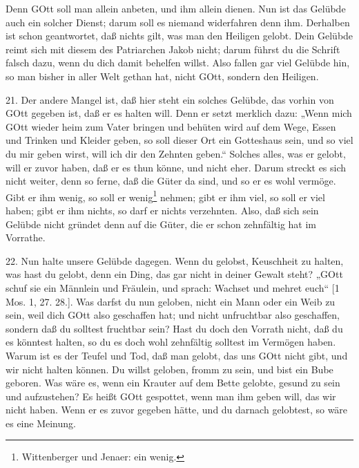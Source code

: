 Denn GOtt soll man allein anbeten, und ihm allein dienen. Nun ist das Gelübde auch ein solcher Dienst; darum soll es niemand widerfahren denn ihm. Derhalben ist schon geantwortet, daß nichts gilt, was man den Heiligen gelobt. Dein Gelübde reimt sich mit diesem des Patriarchen Jakob nicht; darum führst du die Schrift falsch dazu, wenn du dich damit behelfen willst. Also fallen gar viel Gelübde hin, so man bisher in aller Welt gethan hat, nicht GOtt, sondern den Heiligen.

21. Der andere Mangel ist, daß hier steht ein solches Gelübde, das vorhin von GOtt gegeben ist, daß er es halten will. Denn er setzt merklich dazu: „Wenn mich GOtt wieder heim zum Vater bringen und behüten wird auf dem Wege, Essen und Trinken und Kleider geben, so soll dieser Ort ein Gotteshaus sein, und so viel du mir geben wirst, will ich dir den Zehnten geben.“ Solches alles, was er gelobt, will er zuvor haben, daß er es thun könne, und nicht eher. Darum streckt es sich nicht weiter, denn so ferne, daß die Güter da sind, und so er es wohl vermöge. Gibt er ihm wenig, so soll er wenig\footnote{Wittenberger und Jenaer: ein wenig.} nehmen; gibt er ihm viel, so soll er viel haben; gibt er ihm nichts, so darf er nichts verzehnten. Also, daß sich sein Gelübde nicht gründet denn auf die Güter, die er schon zehnfältig hat im Vorrathe.

22. Nun halte unsere Gelübde dagegen. Wenn du gelobst, Keuschheit zu halten, was hast du gelobt, denn ein Ding, das gar nicht in deiner Gewalt steht? „GOtt schuf sie ein Männlein und Fräulein, und sprach: Wachset und mehret euch“ [1 Mos. 1, 27. 28.]. Was darfst du nun geloben, nicht ein Mann oder ein Weib zu sein, weil dich GOtt also geschaffen hat; und nicht unfruchtbar also geschaffen, sondern daß du solltest fruchtbar sein? Hast du doch den Vorrath nicht, daß du es könntest halten, so du es doch wohl zehnfältig solltest im Vermögen haben. Warum ist es der Teufel und Tod, daß man gelobt, das uns GOtt nicht gibt, und wir nicht halten können. Du willst geloben, fromm zu sein, und bist ein Bube geboren. Was wäre es, wenn ein Krauter auf dem Bette gelobte, gesund zu sein und aufzustehen? Es heißt GOtt gespottet, wenn man ihm geben will, das wir nicht haben. Wenn er es zuvor gegeben hätte, und du darnach gelobtest, so wäre es eine Meinung.

